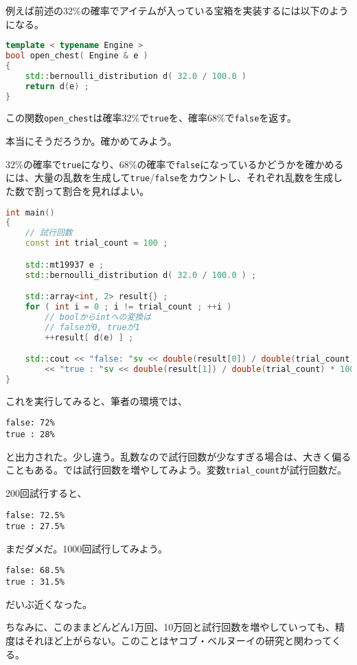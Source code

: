 例えば前述の32\%の確率でアイテムが入っている宝箱を実装するには以下のようになる。

\begin{lstlisting}[language={C++}]
template < typename Engine >
bool open_chest( Engine & e )
{
    std::bernoulli_distribution d( 32.0 / 100.0 )
    return d(e) ;
} 
\end{lstlisting}

この関数\texttt{open\_chest}は確率32\%で\texttt{true}を、確率68\%で\texttt{false}を返す。

本当にそうだろうか。確かめてみよう。

32\%の確率で\texttt{true}になり、68\%の確率で\texttt{false}になっているかどうかを確かめるには、大量の乱数を生成して\texttt{true}/\texttt{false}をカウントし、それぞれ乱数を生成した数で割って割合を見ればよい。

\begin{lstlisting}[language={C++}]
int main()
{
    // 試行回数
    const int trial_count = 100 ;

    std::mt19937 e ;
    std::bernoulli_distribution d( 32.0 / 100.0 ) ;

    std::array<int, 2> result{} ;
    for ( int i = 0 ; i != trial_count ; ++i )
        // boolからintへの変換は
        // falseが0, trueが1
        ++result[ d(e) ] ;

    std::cout << "false: "sv << double(result[0]) / double(trial_count) * 100.0 << "%\n"sv
        << "true : "sv << double(result[1]) / double(trial_count) * 100.0 << "%\n"sv ;
}
\end{lstlisting}

これを実行してみると、筆者の環境では、
\begin{lstlisting}[style=terminal]
false: 72%
true : 28%
\end{lstlisting}
と出力された。少し違う。乱数なので試行回数が少なすぎる場合は、大きく偏ることもある。では試行回数を増やしてみよう。変数\texttt{trial\_count}が試行回数だ。

200回試行すると、

\begin{lstlisting}[style=terminal]
false: 72.5%
true : 27.5%
\end{lstlisting}
まだダメだ。1000回試行してみよう。
\begin{lstlisting}[style=terminal]
false: 68.5%
true : 31.5%
\end{lstlisting}

だいぶ近くなった。

ちなみに、このままどんどん1万回、10万回と試行回数を増やしていっても、精度はそれほど上がらない。このことはヤコブ・ベルヌーイの研究と関わってくる。

